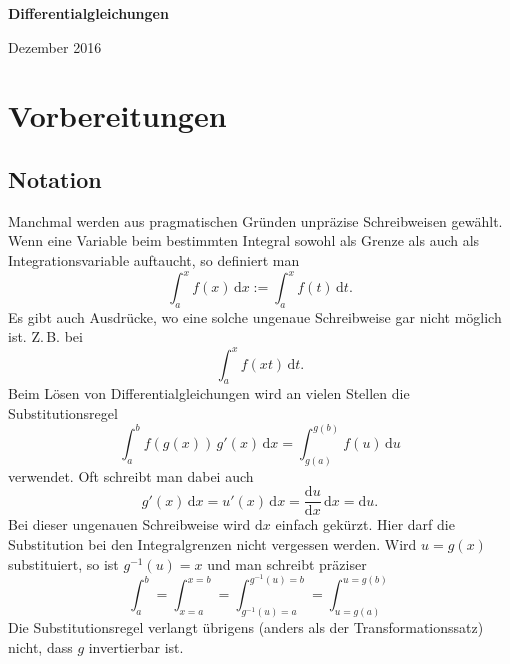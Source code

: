 \documentclass[a4paper,10pt,fleqn,twocolumn,twoside,openany]{scrartcl}
\numberwithin{equation}{section}
\theoremstyle{definition}
\begin{document}
\setlength{\abovedisplayskip}{6pt}
\setlength{\belowdisplayskip}{6pt}
\setlength{\abovedisplayshortskip}{6pt}
\setlength{\belowdisplayshortskip}{6pt}

\begin{titlepage}
\centering
\phantom{x}

\vspace{20em}
{\noindent\Huge\sffamily\textbf{Differentialgleichungen}}

\vspace{2em}
{\Large Dezember 2016}\\
\end{titlepage}

\thispagestyle{empty}

\renewcommand{\contentsname}{
\normalfont\sffamily\bfseries\LARGE
Inhaltsverzeichnis}
\tableofcontents

\section{Vorbereitungen}
\subsection{Notation}
Manchmal werden aus pragmatischen Gründen unpräzise Schreibweisen
gewählt. Wenn eine Variable beim bestimmten Integral sowohl als Grenze
als auch als Integrationsvariable auftaucht, so definiert man
\begin{equation}
\int_a^x f(x)\,\mathrm dx := \int_a^x f(t)\,\mathrm dt.
\end{equation}
Es gibt auch Ausdrücke, wo eine solche ungenaue Schreibweise gar nicht
möglich ist. Z.\,B. bei
\begin{equation}
\int_a^x f(xt)\,\mathrm dt.
\end{equation}
Beim Lösen von Differentialgleichungen
wird an vielen Stellen die Substitutionsregel
\begin{equation}
\int_a^b f(g(x))\,g'(x)\,\mathrm dx
= \int_{g(a)}^{g(b)} f(u)\,\mathrm du
\end{equation}
verwendet. Oft schreibt man dabei auch
\begin{equation}
g'(x)\,\mathrm dx = u'(x)\,\mathrm dx
= \frac{\mathrm du}{\mathrm dx}\,\mathrm dx
= \mathrm du.
\end{equation}
Bei dieser ungenauen Schreibweise wird $\mathrm dx$ einfach
{\glqq}gekürzt{\grqq}. Hier darf die Substitution bei den
Integralgrenzen nicht vergessen werden. Wird $u=g(x)$ substituiert,
so ist $g^{-1}(u)=x$ und man schreibt präziser
\begin{equation}
\int_a^b = \int_{x=a}^{x=b} = \int_{g^{-1}(u)=a}^{g^{-1}(u)=b}
= \int_{u=g(a)}^{u=g(b)}
\end{equation}
Die Substitutionsregel verlangt übrigens (anders als der
Transformationssatz) nicht, dass $g$ invertierbar ist.
\end{document}
